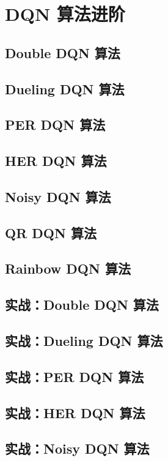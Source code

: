 \section{ DQN 算法进阶}
\subsection{ Double DQN 算法}

\subsection{ Dueling DQN 算法}

\subsection{ PER DQN 算法}
\subsection{ HER DQN 算法}

\subsection{ Noisy DQN 算法}
\subsection{ QR DQN 算法}
\subsection{ Rainbow DQN 算法}


\subsection{实战：Double DQN 算法}

\subsection{实战：Dueling DQN 算法}

\subsection{实战：PER DQN 算法}

\subsection{实战：HER DQN 算法}
\subsection{实战：Noisy DQN 算法}
